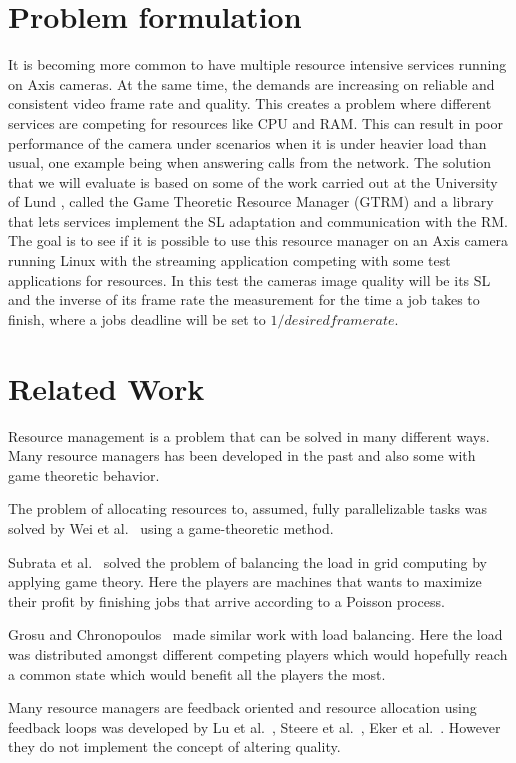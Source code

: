 \documentclass[nobiblatex]{LTHthesis}
\newcommand{\martina}[1]{\todo[inline,color=red!30,caption={}]{\textbf{Martina:} #1}}
\begin{document}
\section{Problem formulation}
It is becoming more common to have multiple resource intensive services running on Axis cameras. At the same time, the demands are increasing on reliable and consistent video frame rate and quality. This creates a problem where different services are competing for resources like CPU and RAM. This can result in poor performance of the camera under scenarios when it is under heavier load than usual, one example being when answering calls from the network. The solution that we will evaluate is based on some of the work carried out at the University of Lund \cite{gtrm}, called the Game Theoretic Resource Manager (GTRM) and a library that lets services implement the SL adaptation and communication with the RM. The goal is to see if it is possible to use this resource manager on an Axis camera running Linux with the streaming application competing with some test applications for resources. In this test the cameras image quality will be its SL and the inverse of its frame rate the measurement for the time a job takes to finish, where a jobs deadline will be set to \(1/desired framerate\).


\section{Related Work}

\martina{Rephrase this}

Resource management is a problem that can be solved in many different ways. Many resource managers has been developed in the past and also some with game theoretic behavior.  

The problem of allocating resources to, assumed, fully parallelizable tasks was solved by Wei et al.~\cite{Wei10} using a game-theoretic method.

Subrata et al.~\cite{Sub08} solved the problem of balancing the load in grid computing by applying game theory. Here the players are machines that wants to maximize their profit by finishing jobs that arrive according to a Poisson process.

Grosu and
Chronopoulos~\cite{Gro05} made similar work with load balancing. Here the load was distributed amongst different competing players which would hopefully reach a common state which would benefit all the players the most.

Many resource managers are feedback oriented and resource allocation using feedback loops was developed by Lu et al.~\cite{LuS99a},
Steere et al.~\cite{Ste99}, Eker et al.~\cite{Eke00}. However they do not implement the concept of altering quality.
\end{document}
